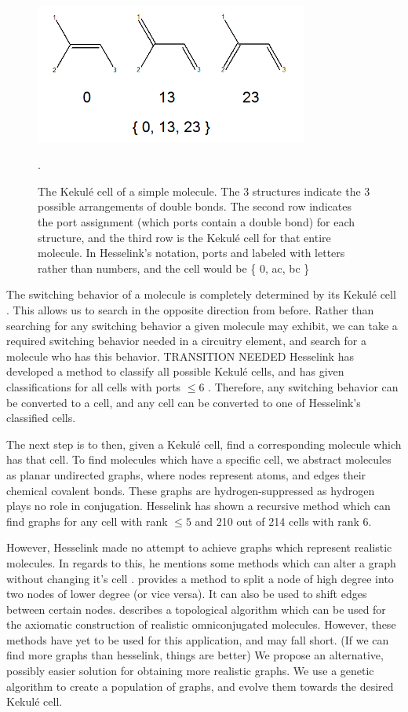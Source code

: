 \documentclass[12pt]{article}
\begin{document}
\begin{figure}[ht!]
\centering
\includegraphics[width=90mm]{KekuleCell.png}
\caption{The Kekul\'e cell of a simple molecule. The 3 structures indicate the 3 possible arrangements of double bonds. The second row indicates the port assignment (which ports contain a double bond) for each structure, and the third row is the Kekul\'e cell for that entire molecule. In Hesselink's notation, ports and labeled with letters rather than numbers, and the cell would be \{ 0, ac, bc \} }.
\end{figure}

The switching behavior of a molecule is completely determined by its Kekul\'e cell \cite{H13, HH13}. This allows us to search in the opposite direction from before. Rather than searching for any switching behavior a given molecule may exhibit, we can take a required switching behavior needed in a circuitry element, and search for a molecule who has this behavior. TRANSITION NEEDED Hesselink \cite{H13} has developed a method to classify all possible Kekul\'e cells, and has given classifications for all cells with ports $\le 6$ . Therefore, any switching behavior can be converted to a cell, and any cell can be converted to one of Hesselink's \cite{H13} classified cells.

The next step is to then, given a Kekul\'e cell, find a corresponding molecule which has that cell. To find molecules which have a specific cell, we abstract molecules as planar undirected graphs, where nodes represent atoms, and edges their chemical covalent bonds. These graphs are hydrogen-suppressed as hydrogen plays no role in conjugation. Hesselink \cite{H13} has shown a recursive method which can find graphs for any cell with rank $\le 5$ and 210 out of 214 cells with rank 6. 

However, Hesselink made no attempt to achieve graphs which represent realistic molecules. In regards to this, he mentions some methods which can alter a graph without changing it's cell \cite{HH13, v06}. \cite{HH13} provides a method to split a node of high degree into two nodes of lower degree (or vice versa). It can also be used to shift edges between certain nodes. \cite{v06} describes a topological algorithm which can be used for the axiomatic construction of realistic omniconjugated molecules. However, these methods have yet to be used for this application, and may fall short. (If we can find more graphs than hesselink, things are better) We propose an alternative, possibly easier solution for obtaining more realistic graphs. We use a genetic algorithm to create a population of graphs, and evolve them towards the desired Kekul\'e cell.
\end{document}
